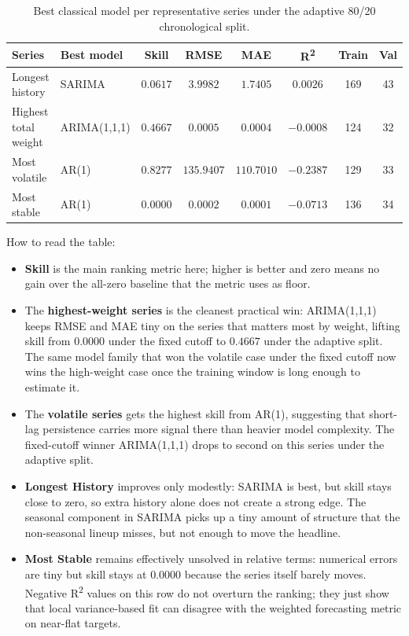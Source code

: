 \begin{table}[h]
\centering
\caption{Best classical model per representative series under the adaptive 80/20 chronological split.}
\label{tab:classical_leaderboard_adaptive}
\begin{tabular}{l l c c c c c c}
\toprule
Series & Best model & Skill & RMSE & MAE & R\textsuperscript{2} & Train & Val \\
\midrule
Longest history      & SARIMA       & $0.0617$ & $3.9982$  & $1.7405$  & $0.0026$  & 169 & 43 \\
Highest total weight & ARIMA(1,1,1) & $0.4667$ & $0.0005$  & $0.0004$  & $-0.0008$ & 124 & 32 \\
Most volatile        & AR(1)        & $\mathbf{0.8277}$ & $135.9407$ & $110.7010$ & $-0.2387$ & 129 & 33 \\
Most stable          & AR(1)        & $0.0000$ & $0.0002$  & $0.0001$  & $-0.0713$ & 136 & 34 \\
\bottomrule
\end{tabular}
\end{table}

How to read the table:
\begin{itemize}
  \item \textbf{Skill} is the main ranking metric here; higher is better and zero means no gain over the all-zero baseline that the metric uses as floor.
  \item The \textbf{highest-weight series} is the cleanest practical win: ARIMA(1,1,1) keeps RMSE and MAE tiny on the series that matters most by weight, lifting skill from $0.0000$ under the fixed cutoff to $0.4667$ under the adaptive split. The same model family that won the volatile case under the fixed cutoff now wins the high-weight case once the training window is long enough to estimate it.
  \item The \textbf{volatile series} gets the highest skill from AR(1), suggesting that short-lag persistence carries more signal there than heavier model complexity. The fixed-cutoff winner ARIMA(1,1,1) drops to second on this series under the adaptive split.
  \item \textbf{Longest History} improves only modestly: SARIMA is best, but skill stays close to zero, so extra history alone does not create a strong edge. The seasonal component in SARIMA picks up a tiny amount of structure that the non-seasonal lineup misses, but not enough to move the headline.
  \item \textbf{Most Stable} remains effectively unsolved in relative terms: numerical errors are tiny but skill stays at $0.0000$ because the series itself barely moves. Negative R\textsuperscript{2} values on this row do not overturn the ranking; they just show that local variance-based fit can disagree with the weighted forecasting metric on near-flat targets.
\end{itemize}

